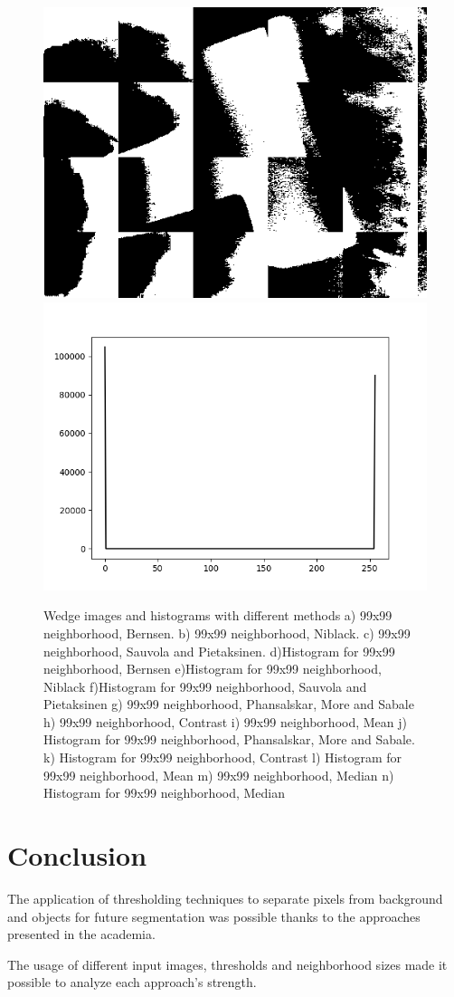 \documentclass[]{IEEEtran}
\begin{document}
\begin{figure}[h]
  \includegraphics[width=0.3\hsize]{images/99x99-window/wedge_median.png}
  \includegraphics[width=0.3\hsize]{images/99x99-window/wedge_median_histogram.png}

  \caption{Wedge images and histograms with different methods a) 99x99 neighborhood, Bernsen. b) 99x99 neighborhood, Niblack. c) 99x99 neighborhood, Sauvola and Pietaksinen. d)Histogram for 99x99 neighborhood, Bernsen e)Histogram for 99x99 neighborhood, Niblack f)Histogram for 99x99 neighborhood, Sauvola and Pietaksinen g) 99x99 neighborhood, Phansalskar, More and Sabale h) 99x99 neighborhood, Contrast i) 99x99 neighborhood, Mean j) Histogram for 99x99 neighborhood, Phansalskar, More and Sabale. k) Histogram for 99x99 neighborhood, Contrast l) Histogram for 99x99 neighborhood, Mean m) 99x99 neighborhood, Median n) Histogram for 99x99 neighborhood, Median}
  \label{fig:local-wedge}
\end{figure}

\section{Conclusion}
The application of thresholding techniques to separate pixels from background and objects for future segmentation was possible thanks to the approaches presented in the academia.

The usage of different input images, thresholds and neighborhood sizes made it possible to analyze each approach's strength.
\end{document}
